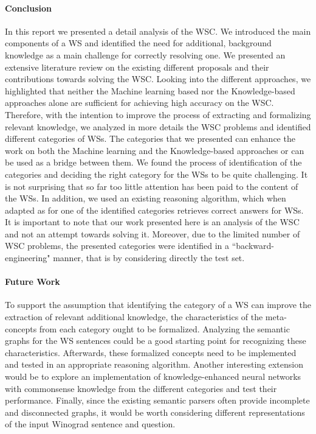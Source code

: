 
\paragraph{Conclusion}
In this report we presented a detail analysis of the WSC. We introduced the main components of a WS and identified the need for additional, background knowledge as a main challenge for correctly resolving one. We presented an extensive literature review on the existing different proposals and their contributions towards solving the WSC. Looking into the different approaches, we highlighted that neither the Machine learning based nor the Knowledge-based approaches alone are sufficient for achieving high accuracy on the WSC. Therefore, with the intention to improve the process of extracting and formalizing relevant knowledge, we analyzed in more details the WSC problems and identified different categories of WSs. The categories that we presented can enhance the work on both the  Machine learning and the Knowledge-based approaches or can be used as a bridge between them. We found the process of identification of the categories and deciding the right category for the WSs to be quite challenging. It is not surprising that so far too little attention has been paid to the content of the WSs. In addition, we used an existing reasoning algorithm, which when adapted as for one of the identified categories retrieves correct answers for WSs. 
It is important to note that our work presented here is an analysis of the WSC and not an attempt towards solving it. Moreover, due to the limited number of WSC problems, the presented categories were identified in a ``backward-engineering" manner, that is by considering directly the test set. 

\paragraph{Future Work}
To support the assumption that identifying the category of a WS can improve the extraction of relevant additional knowledge, the characteristics of the meta-concepts from each category ought to be formalized. Analyzing the semantic graphs for the WS sentences could be a good starting point for recognizing these characteristics. Afterwards, these formalized concepts need to be implemented and tested in an appropriate reasoning algorithm. 
Another interesting extension would be to explore an implementation of knowledge-enhanced neural networks \cite{DBLP:conf/aaai/MaPC18} with commonsense knowledge from the different categories and test their performance. 
Finally, since the existing semantic parsers often provide incomplete and disconnected graphs, it would be worth considering different representations of the input Winograd sentence and question. 

